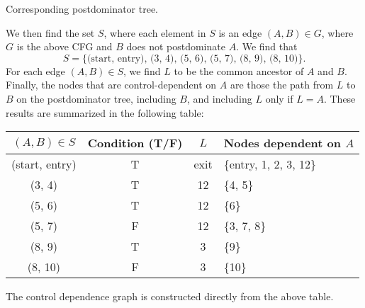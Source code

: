 \documentclass{article}
\newcommand\s[1]{\{#1\}}
\begin{document}
\begin{enumerate}
\begin{enumerate}
\begin{minipage}[t]{\linewidth}
\begin{minipage}[t]{.5\linewidth}
\begin{minipage}[t]{.9\linewidth}
\begin{center}
              \end{center}
              Corresponding postdominator tree.
            \end{minipage}
          \end{minipage}
        \end{minipage}

        We then find the set $S$, where each element in $S$ is an edge
        $(A, B) \in G$, where $G$ is the above CFG and $B$ does not
        postdominate $A$. We find that
        \begin{equation*}
          S = \text{\s{(start, entry), (3, 4), (5, 6), (5, 7), (8, 9),
          (8, 10)}}.
        \end{equation*}
        For each edge $(A,B) \in S$, we find $L$ to be the common
        ancestor of $A$ and $B$. Finally, the nodes that are
        control-dependent on $A$ are those the path from $L$ to $B$ on
        the postdominator tree, including $B$, and including $L$ only
        if $L=A$. These results are summarized in the following table:
        \begin{center}
          \begin{tabular}{cccl}
            \toprule
            $(A,B) \in S$ & Condition (T/F) & $L$ & Nodes dependent on
            $A$ \\
            \midrule
            (start, entry) & T & exit & \s{entry, 1, 2, 3, 12} \\
            (3, 4)         & T & 12   & \s{4, 5} \\
            (5, 6)         & T & 12   & \s{6} \\
            (5, 7)         & F & 12   & \s{3, 7, 8} \\
            (8, 9)         & T & 3    & \s{9} \\
            (8, 10)        & F & 3    & \s{10} \\
            \bottomrule
          \end{tabular}
        \end{center}
        The control dependence graph is constructed directly from the
        above table.


\end{enumerate}
\end{enumerate}
\end{document}
